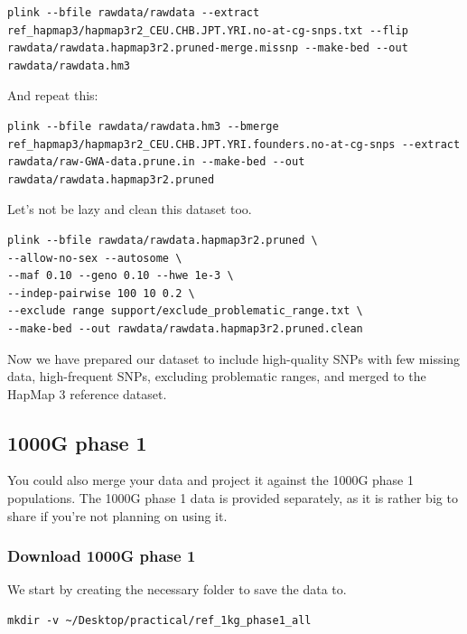\documentclass[
]{book}
\begin{document}
\begin{lstlisting}
plink --bfile rawdata/rawdata --extract ref_hapmap3/hapmap3r2_CEU.CHB.JPT.YRI.no-at-cg-snps.txt --flip rawdata/rawdata.hapmap3r2.pruned-merge.missnp --make-bed --out rawdata/rawdata.hm3
\end{lstlisting}

And repeat this:

\begin{lstlisting}
plink --bfile rawdata/rawdata.hm3 --bmerge ref_hapmap3/hapmap3r2_CEU.CHB.JPT.YRI.founders.no-at-cg-snps --extract rawdata/raw-GWA-data.prune.in --make-bed --out rawdata/rawdata.hapmap3r2.pruned
\end{lstlisting}

Let's not be lazy and clean this dataset too.

\begin{lstlisting}
plink --bfile rawdata/rawdata.hapmap3r2.pruned \
--allow-no-sex --autosome \
--maf 0.10 --geno 0.10 --hwe 1e-3 \
--indep-pairwise 100 10 0.2 \
--exclude range support/exclude_problematic_range.txt \
--make-bed --out rawdata/rawdata.hapmap3r2.pruned.clean
\end{lstlisting}

Now we have prepared our dataset to include high-quality SNPs with few missing data, high-frequent SNPs, excluding problematic ranges, and merged to the HapMap 3 reference dataset.

\hypertarget{g-phase-1}{%
\subsection{1000G phase 1}\label{g-phase-1}}

You could also merge your data and project it against the 1000G phase 1 populations. The 1000G phase 1 data is provided separately, as it is rather big to share if you're not planning on using it.

\hypertarget{download-1000g-phase-1}{%
\subsubsection{Download 1000G phase 1}\label{download-1000g-phase-1}}

We start by creating the necessary folder to save the data to.

\begin{lstlisting}
mkdir -v ~/Desktop/practical/ref_1kg_phase1_all
\end{lstlisting}
\end{document}
